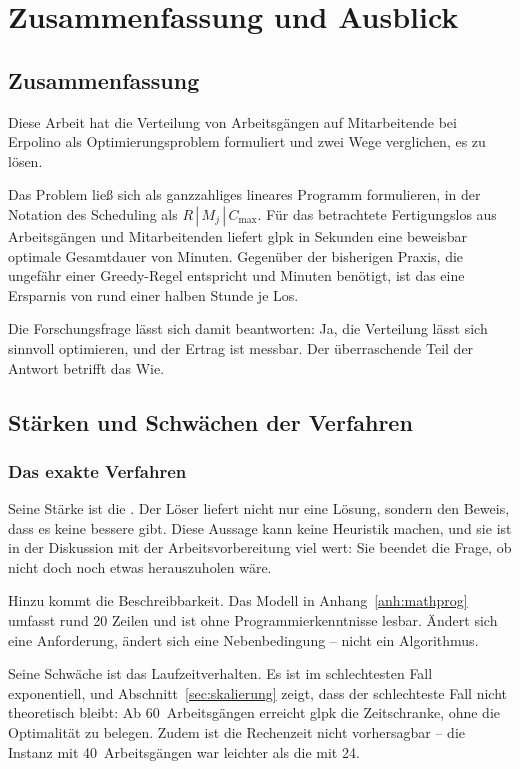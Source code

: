 \chapter{Zusammenfassung und Ausblick}
\label{kap:zusammenfassung}

\section{Zusammenfassung}

Diese Arbeit hat die Verteilung von Arbeitsgängen auf Mitarbeitende bei
Erpolino als Optimierungsproblem formuliert und zwei Wege verglichen,
es zu lösen.

Das Problem ließ sich als ganzzahliges lineares Programm formulieren, in
der Notation des Scheduling als $R\,|\,M_j\,|\,C_{\max}$. Für das
betrachtete Fertigungslos aus \ZahlAufgaben{} Arbeitsgängen und
\ZahlMitarbeiter{} Mitarbeitenden liefert \ac{glpk} in \MilpSekunden{}
Sekunden eine beweisbar optimale Gesamtdauer von \Optimum{} Minuten.
Gegenüber der bisherigen Praxis, die ungefähr einer Greedy-Regel
entspricht und \MakespanGreedy{} Minuten benötigt, ist das eine
Ersparnis von rund einer halben Stunde je Los.

Die Forschungsfrage lässt sich damit beantworten: Ja, die Verteilung
lässt sich sinnvoll optimieren, und der Ertrag ist messbar. Der
überraschende Teil der Antwort betrifft das Wie.

\section{Stärken und Schwächen der Verfahren}

\subsection{Das exakte Verfahren}

Seine Stärke ist die . Der Löser liefert nicht nur
eine Lösung, sondern den Beweis, dass es keine bessere gibt. Diese
Aussage kann keine Heuristik machen, und sie ist in der Diskussion mit
der Arbeitsvorbereitung viel wert: Sie beendet die Frage, ob nicht doch
noch etwas herauszuholen wäre.

Hinzu kommt die Beschreibbarkeit. Das Modell in
Anhang~\ref{anh:mathprog} umfasst rund 20 Zeilen und ist ohne
Programmierkenntnisse lesbar. Ändert sich eine Anforderung, ändert sich
eine Nebenbedingung -- nicht ein Algorithmus.

Seine Schwäche ist das Laufzeitverhalten. Es ist im schlechtesten Fall
exponentiell, und Abschnitt~\ref{sec:skalierung} zeigt, dass der
schlechteste Fall nicht theoretisch bleibt: Ab 60~Arbeitsgängen erreicht
\ac{glpk} die Zeitschranke, ohne die Optimalität zu belegen. Zudem ist
die Rechenzeit nicht vorhersagbar -- die Instanz mit 40~Arbeitsgängen
war leichter als die mit 24.

